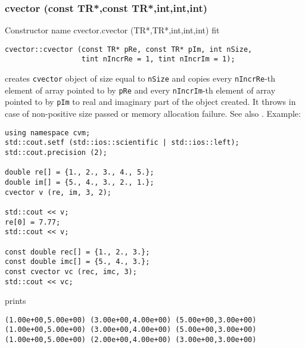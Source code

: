 \subsubsection{cvector (const TR*,const TR*,int,int,int)}
Constructor%
\pdfdest name {cvector.cvector (TR*,TR*,int,int,int)} fit
\begin{verbatim}
cvector::cvector (const TR* pRe, const TR* pIm, int nSize,
                  tint nIncrRe = 1, tint nIncrIm = 1);
\end{verbatim}
creates  \verb"cvector" object
of size equal to \verb"nSize" and copies 
every \verb"nIncrRe"-th element of array pointed to by \verb"pRe" 
and 
every \verb"nIncrIm"-th element of array pointed to by \verb"pIm"
to real and imaginary part of the object created.
It throws  
in case of non-positive size passed or memory allocation failure.
See also .
Example:
\begin{Verbatim}
using namespace cvm;
std::cout.setf (std::ios::scientific | std::ios::left);
std::cout.precision (2);

double re[] = {1., 2., 3., 4., 5.};
double im[] = {5., 4., 3., 2., 1.};
cvector v (re, im, 3, 2);

std::cout << v;
re[0] = 7.77;
std::cout << v;

const double rec[] = {1., 2., 3.};
const double imc[] = {5., 4., 3.};
const cvector vc (rec, imc, 3);
std::cout << vc;
\end{Verbatim}
prints
\begin{Verbatim}
(1.00e+00,5.00e+00) (3.00e+00,4.00e+00) (5.00e+00,3.00e+00)
(1.00e+00,5.00e+00) (3.00e+00,4.00e+00) (5.00e+00,3.00e+00)
(1.00e+00,5.00e+00) (2.00e+00,4.00e+00) (3.00e+00,3.00e+00)
\end{Verbatim}
\newpage



